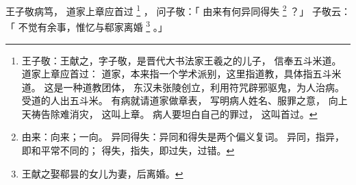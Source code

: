 
\switchcolumn*[\section{}]

王子敬病笃，
道家上章应首过%
\footnote{%
    王子敬：王献之，字子敬，是晋代大书法家王羲之的儿子，
            信奉五斗米道。
    道家上章应首过：
            道家，本来指一个学术派别，这里指道教，具体指五斗米道。
            这是一种道教团体，
            东汉未张陵创立，利用符咒辟邪驱鬼，为人治病。
            受道的人出五斗米。
            有病就请道家做章表，
            写明病人姓名、服罪之意，
            向上天祷告除难消灾，
            这叫上章。
            病人要坦白自己的罪过，
            这叫首过。
}%
，
问子敬：「
    由来有何异同得失%
    \footnote{%
        由来：向来；一向。
        异同得失：异同和得失是两个偏义复词。
                  异同，指异，即和平常不同的；
                  得失，指失，即过失，过错。
    }%
？」
子敬云：「
    不觉有余事，惟忆与郗家离婚%
    \footnote{%
        王献之娶郗昙的女儿为妻，后离婚。       
    }%
。」

\switchcolumn


